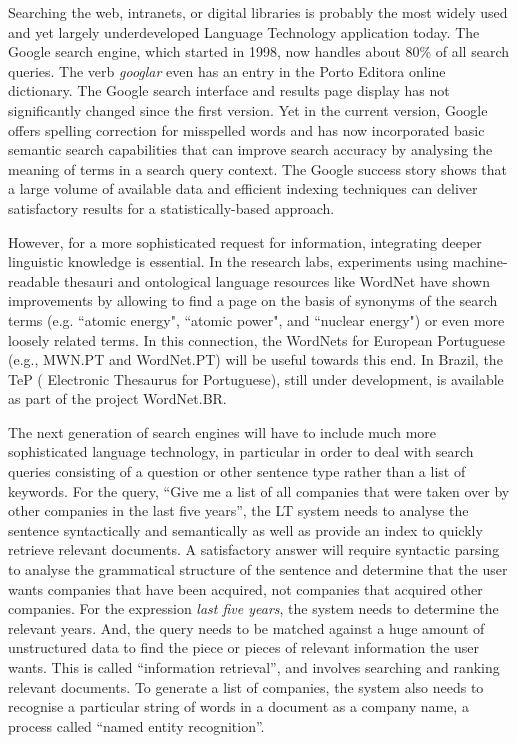 \begin{multicols}{2}
  Searching the web, intranets, or digital libraries is probably the most widely used and yet largely underdeveloped Language Technology application today. The Google search engine, which started in 1998, now handles about 80\% of all search queries\cite{spi1}. The verb \textit{googlar} even has an entry in the Porto E\-di\-to\-ra online dictionary. The Google search interface and results page display has not significantly changed since the first version. Yet in the current version, Google offers spelling correction for misspelled words and  has now incorporated basic semantic search capabilities that can improve search accuracy by analysing the meaning of terms in a search query context\cite{pc1}. The Google success story shows that a large volume of available data and efficient indexing techniques can deliver satisfactory results for a statistically-based approach.   


 However, for a more sophisticated request for information, integrating deeper linguistic knowledge is essential. In the research labs, experiments using machine-readable thesauri and ontological language resources like WordNet have shown improvements by allowing to find a page on the basis of synonyms of the search terms (e.g. “atomic energy", “atomic power", and “nuclear energy") or even more loosely related terms. In this connection, the WordNets for European Portuguese (e.g., MWN.PT and WordNet.PT) will be useful towards this end. In Brazil, the TeP ( Electronic Thesaurus for Portuguese), still under development, is available as part of the project WordNet.BR.

The next generation of search engines will have to include much more sophisticated language technology, in particular in order to deal with search queries consisting of a question or other sentence type rather than a list of keywords. For the query, “Give me a list of all companies that were taken over by other companies in the last five years”, the LT system needs to analyse the sentence syntactically and semantically as well as provide an index to quickly retrieve relevant documents. A satisfactory answer will require syntactic parsing to analyse the grammatical structure of the sentence and determine that the user wants companies that have been acquired, not companies that acquired other companies. For the expression \textit{last five years}, the system needs to determine the relevant years. And, the query needs to be matched against a huge amount of unstructured data to find the piece or pieces of relevant information the user wants. This is called “information retrieval”, and involves searching and ranking relevant documents. To generate a list of companies, the system also needs to recognise a particular string of words in a document as a company name, a process called “named entity recognition”.


\end{multicols}
